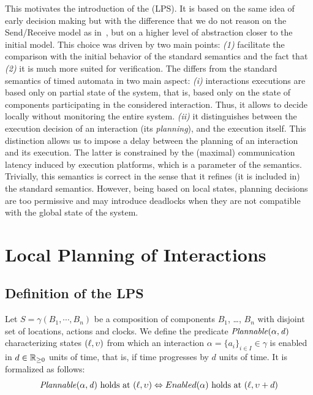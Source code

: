 This motivates the introduction of the \emph{\lpsb} (LPS). It is based on the same idea of 
early decision making but with the difference that we do not reason on the Send/Receive model
as in~\cite{ahlem_these}, but on a higher level of abstraction closer to the initial model.
This choice was driven by two main points: \emph{(1)} facilitate the comparison with the 
initial behavior of the standard semantics and the fact that \emph{(2)} it is much more suited 
for verification. 
The \lps differs from
the standard semantics of timed automata in two main aspect: \emph{(i)} interactions executions
are based only on partial state of the system, that is, based only on the state of components
participating in the considered interaction. Thus, it allows to decide locally without 
monitoring the entire system. \emph{(ii)} it distinguishes between the 
execution decision of an interaction (its \emph{planning}), and the execution itself.
This distinction allows us to impose a delay between the planning of an interaction and 
its execution. The latter is constrained by the (maximal) communication latency induced 
by execution platforms, which is a parameter of the semantics.
Trivially, this semantics is correct in the sense that it refines (it is included in) the 
standard semantics.
However, being based on local states, planning decisions are too permissive and may 
introduce deadlocks when they are not compatible with the global state of the system.

\section{Local Planning of Interactions}
\subsection{Definition of the LPS}
\label{subsec:wp} 
Let $S=\gamma(B_1,\cdots,B_n)$ be a composition of components $B_1$, \ldots, $B_n$ with
disjoint set of locations, actions and clocks.
We define the predicate $\mathit{Plannable(\alpha,d)}$ characterizing states $(\ell, \upsilon)$
from which an interaction $\alpha = \{ a_i \}_{i \in I} \in \gamma$ is enabled in 
$d \in \mathbb{R}_{\ge 0}$ units of time, that is, if time progresses by $d$ units of time.
It is formalized as follows:
\begin{equation}\label{eq:enf1}
  \mathit{Plannable(\alpha,d)}\text{ holds at }(\ell,\upsilon)\Leftrightarrow Enabled(\alpha)\text{ holds at
  }(\ell,\upsilon+d)
\end{equation}

